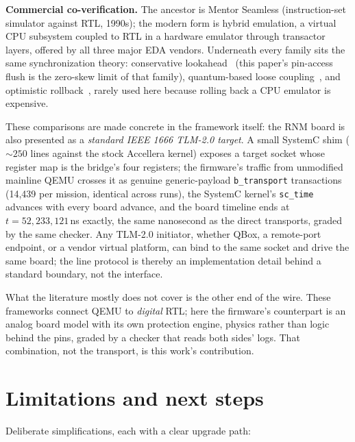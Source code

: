 \documentclass[11pt]{article}
\begin{document}
\textbf{Commercial co-verification.}  The ancestor is Mentor
Seamless (instruction-set simulator against RTL, 1990s); the modern
form is hybrid emulation, a virtual CPU subsystem coupled to RTL in
a hardware emulator through transactor layers, offered by all three
major EDA vendors.  Underneath every family sits the same
synchronization theory: conservative lookahead~\cite{chandy1979}
(this paper's pin-access flush is the zero-skew limit of that
family),
quantum-based loose coupling~\cite{tlm2}, and optimistic
rollback~\cite{jefferson1985}, rarely used here because rolling back
a CPU emulator is expensive.

These comparisons are made concrete in the framework itself: the
RNM board is also presented as a \emph{standard IEEE 1666 TLM-2.0
target}.  A small SystemC shim (${\sim}250$ lines against the stock
Accellera kernel) exposes a target socket whose register map is the
bridge's four registers; the firmware's traffic from unmodified
mainline
QEMU crosses it as genuine generic-payload \texttt{b\_transport}
transactions (14{,}439 per mission, identical across runs), the
SystemC kernel's \texttt{sc\_time} advances with every board
advance, and the board timeline ends at $t = 52{,}233{,}121$\,ns
exactly, the same nanosecond as the direct transports, graded by
the same checker.  Any TLM-2.0 initiator, whether QBox, a
remote-port endpoint, or a vendor virtual platform, can bind to the
same socket and drive the same board; the line protocol is thereby
an implementation detail behind a standard boundary, not the
interface.

What the literature mostly does not cover is the other end of the
wire.  These frameworks connect QEMU to \emph{digital} RTL; here the
firmware's counterpart is an analog board model with its own
protection engine, physics rather than logic behind the pins, graded
by a checker that reads both sides' logs.  That combination, not the
transport, is this work's contribution.

\section{Limitations and next steps}

Deliberate simplifications, each with a clear upgrade path:
\end{document}
